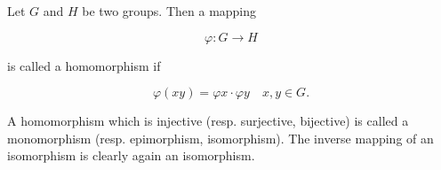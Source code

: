 Let $G$ and $H$ be two groups. Then a mapping

$$\varphi: G \rightarrow H$$

is called a homomorphism if

$$\varphi(xy) = \varphi x \cdot \varphi y \quad x, y \in G.$$

A homomorphism which is injective (resp. surjective, bijective) is called a monomorphism (resp. epimorphism, isomorphism). The inverse mapping of an isomorphism is clearly again an isomorphism.
